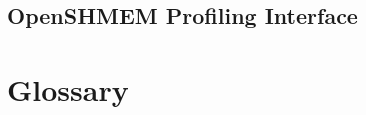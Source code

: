 \documentclass[10pt,oneside]{book}
\begin{document}
\section{OpenSHMEM Profiling Interface}\label{sec:openshmem_profiling_interface}


\clearpage


\chapter*{Glossary}


\clearpage
{}
{}
\printindex
\end{document}
